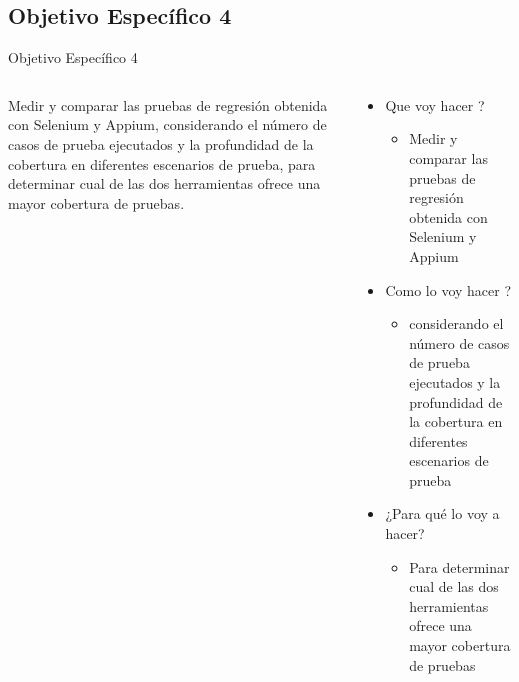 \documentclass{beamer}
\begin{document}
\subsection{Objetivo Específico 4}
\begin{frame}{Objetivo Específico 4 }
  \begin{columns}
    \begin{column}{0.5\textwidth}
    \justify
      Medir y comparar las pruebas de regresión obtenida con Selenium y Appium, considerando el número de casos de prueba ejecutados y la profundidad de la cobertura en diferentes escenarios de prueba, para determinar cual de las dos herramientas ofrece una mayor cobertura de pruebas. 
    \end{column}
    \begin{column}{0.5\textwidth}
      \begin{itemize}
          \item Que voy hacer ?
          \begin{itemize}
              \item  Medir y comparar las pruebas de regresión obtenida con Selenium y Appium
          \end{itemize}
          \item Como lo voy hacer ?
          \begin{itemize}
              \item considerando el número de casos de prueba ejecutados y la profundidad de la cobertura en diferentes escenarios de prueba
          \end{itemize}
         \item ¿Para qué lo voy a hacer?
         \begin{itemize}
              \item Para determinar cual de las dos herramientas ofrece una mayor cobertura de pruebas
          \end{itemize}
      \end{itemize}
    \end{column}
  \end{columns}
\end{frame}
\end{document}
